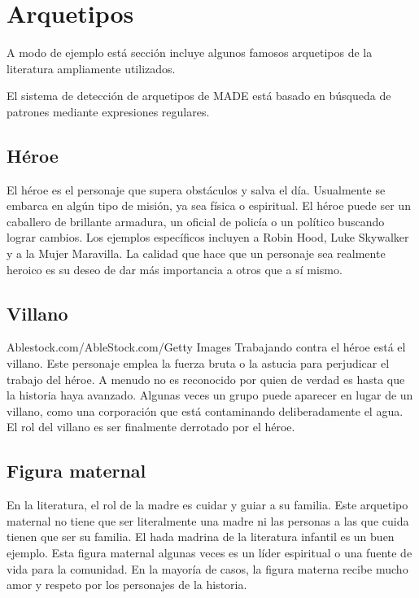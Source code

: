 \section{Arquetipos}

A modo de ejemplo está sección incluye algunos famosos arquetipos de la
literatura ampliamente utilizados.

El sistema de detección de arquetipos de MADE está basado en búsqueda de
patrones mediante expresiones regulares.


\subsection*{Héroe}
El héroe es el personaje que supera obstáculos y salva el día. Usualmente se
embarca en algún tipo de misión, ya sea física o espiritual. El héroe puede ser
un caballero de brillante armadura, un oficial de policía o un político buscando
lograr cambios. Los ejemplos específicos incluyen a Robin Hood, Luke Skywalker y
a la Mujer Maravilla. La calidad que hace que un personaje sea realmente heroico
es su deseo de dar más importancia a otros que a sí mismo.

\subsection*{Villano}
Ablestock.com/AbleStock.com/Getty Images
Trabajando contra el héroe está el villano. Este personaje emplea la fuerza
bruta o la astucia para perjudicar el trabajo del héroe. A menudo no es
reconocido por quien de verdad es hasta que la historia haya avanzado. Algunas
veces un grupo puede aparecer en lugar de un villano, como una corporación que
está contaminando deliberadamente el agua. El rol del villano es ser finalmente
derrotado por el héroe.

\subsection*{Figura maternal}
En la literatura, el rol de la madre es cuidar y guiar a su familia. Este
arquetipo maternal no tiene que ser literalmente una madre ni las personas a las
que cuida tienen que ser su familia. El hada madrina de la literatura infantil
es un buen ejemplo. Esta figura maternal algunas veces es un líder espiritual o
una fuente de vida para la comunidad. En la mayoría de casos, la figura materna
recibe mucho amor y respeto por los personajes de la historia.

